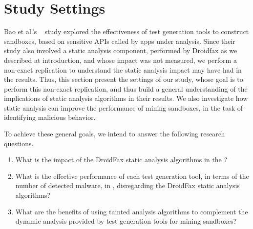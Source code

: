 \section{Study Settings}


Bao et al.'s ~\cite{DBLP:conf/wcre/BaoLL18} study explored the effectiveness of test generation tools to construct sandboxes, based on sensitive APIs called by apps under analysis. Since their study also involved a static analysis component, performed by Droidfax as we described at introduction, and whose impact was not measured, we perform a non-exact replication to understand the static analysis impact may have had in the results. Thus, this section present the settings of our study, whose goal is to perform this non-exact replication, and thus build a general understanding of the implications of static analysis algorithms in their results. We also investigate how static analysis can improve the performance of mining sandboxes, in the task of identifying malicious behavior.

To achieve these general goals, we intend to answer the following research questions.

\begin{enumerate}[(RQ1)]
 
 \item What is the impact of the DroidFax static analysis algorithms in the \blls?
  
 \item What is the effective performance of each test generation tool, in terms of the number of detected malware, in \blls, disregarding the DroidFax
  static analysis algorithms?

 \item What are the benefits of using tainted analysis algorithms to complement the dynamic analysis provided by test generation tools for mining sandboxes?
\end{enumerate}


